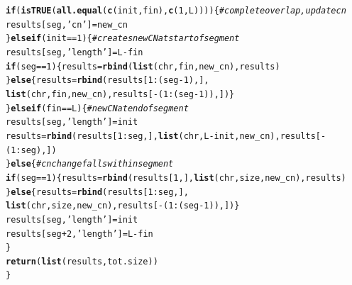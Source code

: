 \documentclass[12pt]{article}\usepackage[]{graphicx}\usepackage[]{color}
\makeatletter
\newcommand{\hlnum}[1]{\textcolor[rgb]{0.686,0.059,0.569}{#1}}%
\newcommand{\hlstr}[1]{\textcolor[rgb]{0.192,0.494,0.8}{#1}}%
\newcommand{\hlcom}[1]{\textcolor[rgb]{0.678,0.584,0.686}{\textit{#1}}}%
\newcommand{\hlopt}[1]{\textcolor[rgb]{0,0,0}{#1}}%
\newcommand{\hlstd}[1]{\textcolor[rgb]{0.345,0.345,0.345}{#1}}%
\newcommand{\hlkwa}[1]{\textcolor[rgb]{0.161,0.373,0.58}{\textbf{#1}}}%
\newcommand{\hlkwb}[1]{\textcolor[rgb]{0.69,0.353,0.396}{#1}}%
\newcommand{\hlkwd}[1]{\textcolor[rgb]{0.737,0.353,0.396}{\textbf{#1}}}%
\newenvironment{kframe}{%
 \def\at@end@of@kframe{}%
 \ifinner\ifhmode%
  \def\at@end@of@kframe{\end{minipage}}%
  \begin{minipage}{\columnwidth}%
 \fi\fi%
 \def\FrameCommand##1{\hskip\@totalleftmargin \hskip-\fboxsep
 \colorbox{shadecolor}{##1}\hskip-\fboxsep
     \hskip-\linewidth \hskip-\@totalleftmargin \hskip\columnwidth}%
 \MakeFramed {\advance\hsize-\width
   \@totalleftmargin\z@ \linewidth\hsize
   \@setminipage}}%
 {\par\unskip\endMakeFramed%
 \at@end@of@kframe}
\makeatother
\begin{document}
\begin{kframe}
\begin{alltt}
  \hlkwa{if} \hlstd{(} \hlkwd{isTRUE}\hlstd{(}\hlkwd{all.equal}\hlstd{(} \hlkwd{c}\hlstd{(init,fin),} \hlkwd{c}\hlstd{(}\hlnum{1}\hlstd{,L) ) ))\{} \hlcom{#complete overlap, update cn}
    \hlstd{results[seg,}\hlstr{'cn'}\hlstd{]}\hlkwb{=}\hlstd{new_cn}
  \hlstd{\}}\hlkwa{else if} \hlstd{(init} \hlopt{==} \hlnum{1}\hlstd{)\{} \hlcom{#creates new CN at start of segment}
    \hlstd{results[seg,}\hlstr{'length'}\hlstd{]} \hlkwb{=} \hlstd{L} \hlopt{-} \hlstd{fin}
    \hlkwa{if}\hlstd{(seg}\hlopt{==}\hlnum{1}\hlstd{)\{results} \hlkwb{=} \hlkwd{rbind}\hlstd{(}\hlkwd{list}\hlstd{(chr, fin, new_cn), results)}
    \hlstd{\}}\hlkwa{else}\hlstd{\{results} \hlkwb{=} \hlkwd{rbind}\hlstd{(results[}\hlnum{1}\hlopt{:}\hlstd{(seg}\hlopt{-}\hlnum{1}\hlstd{),],}
                          \hlkwd{list}\hlstd{(chr, fin, new_cn), results[}\hlopt{-}\hlstd{(}\hlnum{1}\hlopt{:}\hlstd{(seg}\hlopt{-}\hlnum{1}\hlstd{)),])\}}
  \hlstd{\}}\hlkwa{else if} \hlstd{(fin} \hlopt{==} \hlstd{L)\{} \hlcom{#new CN at end of segment}
    \hlstd{results[seg,}\hlstr{'length'}\hlstd{]} \hlkwb{=} \hlstd{init}
    \hlstd{results} \hlkwb{=} \hlkwd{rbind}\hlstd{(results[}\hlnum{1}\hlopt{:}\hlstd{seg,],} \hlkwd{list}\hlstd{(chr, L}\hlopt{-}\hlstd{init, new_cn), results[}\hlopt{-}\hlstd{(}\hlnum{1}\hlopt{:}\hlstd{seg),])}
  \hlstd{\}}\hlkwa{else}\hlstd{\{} \hlcom{#cn change falls within segment}
    \hlkwa{if}\hlstd{(seg} \hlopt{==} \hlnum{1}\hlstd{)\{results} \hlkwb{=} \hlkwd{rbind}\hlstd{(results[}\hlnum{1}\hlstd{,],} \hlkwd{list}\hlstd{(chr, size, new_cn), results)}
    \hlstd{\}}\hlkwa{else}\hlstd{\{results} \hlkwb{=} \hlkwd{rbind}\hlstd{(results[}\hlnum{1}\hlopt{:}\hlstd{seg,],}
                          \hlkwd{list}\hlstd{(chr, size, new_cn), results[}\hlopt{-}\hlstd{(}\hlnum{1}\hlopt{:}\hlstd{(seg}\hlopt{-}\hlnum{1}\hlstd{)),])\}}
    \hlstd{results[seg,}\hlstr{'length'}\hlstd{]}\hlkwb{=} \hlstd{init}
    \hlstd{results[seg}\hlopt{+}\hlnum{2}\hlstd{,}\hlstr{'length'}\hlstd{]}\hlkwb{=} \hlstd{L}\hlopt{-}\hlstd{fin}
  \hlstd{\}}
  \hlkwd{return}\hlstd{(}\hlkwd{list}\hlstd{(results, tot.size))}
\hlstd{\}}


\end{alltt}
\end{kframe}
\end{document}
